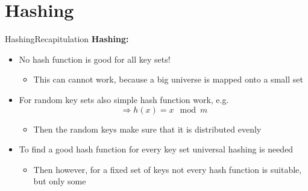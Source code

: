 \section{Hashing}


\begin{frame}{Hashing}{Recapitulation}
  \textbf{Hashing:}
  \begin{itemize}   
  \item<2->
    No hash function is good for all key sets!\\
    \begin{itemize}
    \item<3->
      This can cannot work, because a big universe
      is mapped onto a small set 
    \end{itemize}
  \item<4->
    For random key sets also simple hash function work, e.g.
     {\color{Mittel-Blau}\[\Rightarrow h(x) = x \mod m\]}
     \begin{itemize}
    \item<5->
      Then the random keys make sure that it is distributed evenly
     \end{itemize}
  \item<6->
   To find a good hash function for every key set universal hashing is needed
     \begin{itemize}
    \item<7->
      Then however, for a fixed set of keys not every hash function is suitable,
      but only some
    \end{itemize}   
  \end{itemize}
\end{frame}


